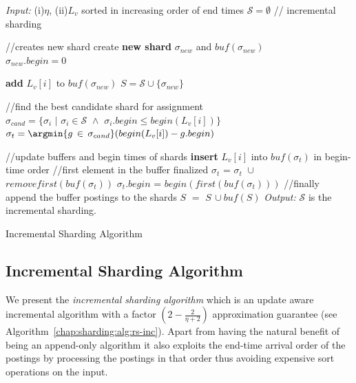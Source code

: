  \begin{algorithm}[htb!]
   \begin{algorithmic}[1]
     \STATE  \emph{Input:} (i)$\eta$, (ii)$L_v$ sorted in increasing order of end times
     \STATE $\mathcal{S} = \emptyset$ \quad // incremental sharding
 		
	\STATE {} 
	\STATE //creates new shard
        		\STATE create \textbf{new shard} $\sigma_{new}$ and $bu\!f(\sigma_{new})$ \\
				\STATE $\sigma_{new}.begin = 0$
			
			\STATE \textbf{add} $L_v[i]$ to $bu\!f(\sigma_{new})$  
                     \STATE $S = \mathcal{S} \cup \{\sigma_{new}\}$
        \ENDIF

	\STATE 

			\STATE //find the best candidate shard for assignment
			\STATE $\sigma_{cand} = \{ \sigma_i \,\,|\,\, \sigma_i \in \mathcal{S} \,\, \wedge  \,\,\sigma_i.begin \leq begin(L_v[i])\}$
			\STATE $\sigma_{t} =\argmin{g\, \in \,\sigma_{cand}} (begin(L_v[i]) - g.begin)$ 

		\STATE
		\STATE //update buffers and begin times of shards
			\STATE \textbf{insert} $L_v[i]$ into $bu\!f(\sigma_{t})$ in begin-time order			 
		\ENDIF
			\STATE  //first element in the buffer finalized
			\STATE $\sigma_{t}$ = $\sigma_{t} \,\, \cup$  $removefirst(bu\!f(\sigma_{t}))$
			\STATE  $\sigma_{t}.begin$ = $begin(first (bu\!f(\sigma_t)))$
		\ENDIF        
   	\ENDFOR 
	\STATE
	\STATE //finally append the buffer postings to the shards
		\STATE	$S \,\,= \,\, S \,\cup bu\!f(S)$
	\ENDFOR
\STATE
\STATE\emph{Output:} $\mathcal{S}$  is the incremental sharding.

   \end{algorithmic}
   \caption{Incremental Sharding Algorithm}
   \label{chap:sharding:alg:rs-inc}
 \end{algorithm}


\subsection{Incremental Sharding Algorithm}

We present the \emph{incremental sharding algorithm} which is an update aware incremental algorithm with a factor $(2  -  \frac{2}{\eta+2})$ approximation guarantee (see Algorithm~\ref{chap:sharding:alg:rs-inc}). Apart from having the natural benefit of being an append-only algorithm it also exploits the end-time arrival order of the postings %
by processing the postings in that order thus avoiding expensive sort operations on the input. 

